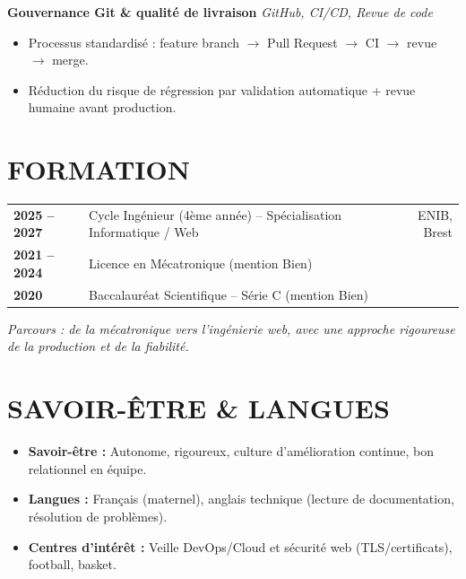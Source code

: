 \documentclass[10pt,a4paper]{article}
\begin{document}
\textbf{Gouvernance Git \& qualité de livraison} \hfill \textit{GitHub, CI/CD, Revue de code}
\begin{itemize}
  \item Processus standardisé : feature branch $\rightarrow$ Pull Request $\rightarrow$ CI $\rightarrow$ revue $\rightarrow$ merge.
  \item Réduction du risque de régression par validation automatique + revue humaine avant production.
\end{itemize}

\section{FORMATION}
\begin{tabularx}{\linewidth}{>{\bfseries}l X r}
2025 -- 2027 & Cycle Ingénieur (4ème année) -- Spécialisation Informatique / Web & ENIB, Brest \\
2021 -- 2024 & Licence en Mécatronique (mention Bien) & \\
2020 & Baccalauréat Scientifique -- Série C (mention Bien) & \\
\end{tabularx}
\textit{Parcours : de la mécatronique vers l'ingénierie web, avec une approche rigoureuse de la production et de la fiabilité.}

\section{SAVOIR-ÊTRE \& LANGUES}
\begin{itemize}
  \item \textbf{Savoir-être :} Autonome, rigoureux, culture d'amélioration continue, bon relationnel en équipe.
  \item \textbf{Langues :} Français (maternel), anglais technique (lecture de documentation, résolution de problèmes).
  \item \textbf{Centres d'intérêt :} Veille DevOps/Cloud et sécurité web (TLS/certificats), football, basket.
\end{itemize}
\end{document}

